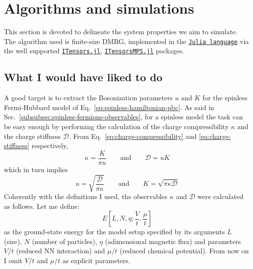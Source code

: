 \clearpage
\section{Algorithms and simulations}

This section is devoted to delineate the system properties we aim to simulate. The algorithm used is finite-size DMRG, implemented in the \href{https://docs.julialang.org/en/}{\texttt{Julia language}} via the well supported \href{https://itensor.github.io/ITensors.jl/stable/index.html}{\texttt{ITensors.jl}}, \href{https://itensor.github.io/ITensorMPS.jl/stable/}{\texttt{ITensorsMPS.jl}} packages.

\subsection{What I would have liked to do}

A good target is to extract the Bosonization parameters $u$ and $K$ for the spinless Fermi-Hubbard model of Eq.~\eqref{eq:spinless-hamiltonian-pbc}. As said in Sec.~\ref{subsubsec:spinless-fermions-observables}, for a spinless model the task can be easy enough by performing the calculation of the charge compressibility $\kappa$ and the charge stiffness $\mathcal{D}$. From Eq.~\eqref{eq:charge-compressibility} and \eqref{eq:charge-stiffness} respectively,
\begin{equation}\label{eq:charge-compressibility-stiffness-definitions}
	\kappa = \frac{K}{\pi u}
	\qquad\text{and}\qquad
	\mathcal{D} = uK
\end{equation}
which in turn implies
\begin{equation}\label{eq:u-K-formulas}
	u = \sqrt{\frac{\mathcal{D}}{\pi\kappa}}
	\qquad\text{and}\qquad
	K = \sqrt{\pi\kappa\mathcal{D}}
\end{equation}
Coherently with the definitions I used, the observables $\kappa$ and $\mathcal{D}$ were calculated as follows. Let me define:
\[
	E\left[
		L,N,\eta;\frac{V}{t},\frac{\mu}{t}
	\right]
\]
as the ground-state energy for the model setup specified by its arguments $L$ (size), $N$ (number of particles), $\eta$ (adimensional magnetic flux) and parameters $V/t$ (reduced NN interaction) and $\mu/t$ (reduced chemical potential). From now on I omit $V/t$ and $\mu/t$ as explicit parameters. 

